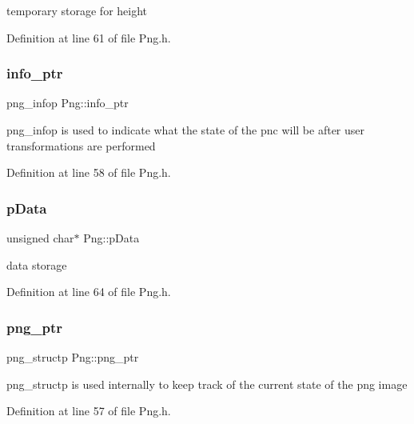 temporary storage for height 

Definition at line 61 of file Png.\+h.

\mbox{\label{classPng_a33d2aad2ce8332b520bab0842ba7d5d9}} 
\subsubsection{\texorpdfstring{info\_ptr}{info\_ptr}}
{\footnotesize\ttfamily png\+\_\+infop Png\+::info\+\_\+ptr\hspace{0.3cm}{\ttfamily [private]}}

png\+\_\+infop is used to indicate what the state of the pnc will be after user transformations are performed 

Definition at line 58 of file Png.\+h.

\mbox{\label{classPng_a7d98b75596a172d31599b3e1102210ab}} 
\subsubsection{\texorpdfstring{pData}{pData}}
{\footnotesize\ttfamily unsigned char$\ast$ Png\+::p\+Data\hspace{0.3cm}{\ttfamily [private]}}

data storage 

Definition at line 64 of file Png.\+h.

\mbox{\label{classPng_acbf8ea4c3185452d8620432e5fbd3e38}} 
\subsubsection{\texorpdfstring{png\_ptr}{png\_ptr}}
{\footnotesize\ttfamily png\+\_\+structp Png\+::png\+\_\+ptr\hspace{0.3cm}{\ttfamily [private]}}

png\+\_\+structp is used internally to keep track of the current state of the png image 

Definition at line 57 of file Png.\+h.

\mbox{\label{classPng_a30b6c073e17f2f0cde3eca9e31036f3c}} 
